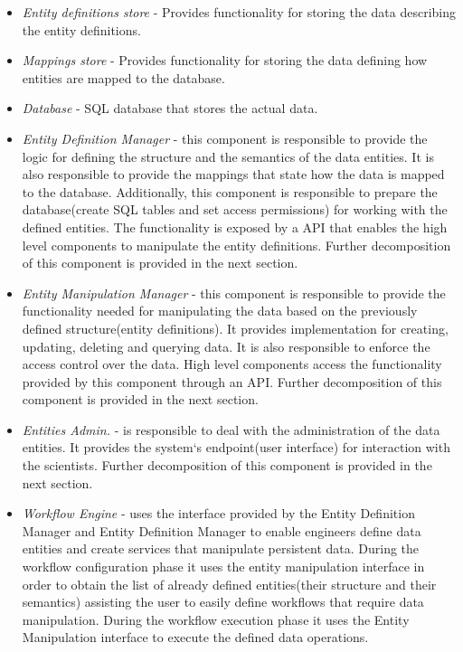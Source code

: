 \documentclass[a4paper, notitlepage]{article}
\begin{document}
\begin{itemize}
	
		\item \textit{Entity definitions store} - Provides functionality for storing the data describing the entity definitions. 
		
	\item \textit{Mappings store} - Provides functionality for storing the data defining how entities are mapped to the database.  
	
	\item \textit{Database} - SQL database that stores the actual data.
	
	\item \textit{Entity Definition Manager} - this component is responsible to provide the logic for defining the structure and the semantics of the data entities. It is also responsible to provide the mappings that state how the data is mapped to the database. Additionally, this component is responsible to prepare the database(create SQL tables and set access permissions) for working with the defined entities. The functionality is exposed by a API that enables the high level components to manipulate the entity definitions. Further decomposition of this component is provided in the next section.
		
	\item \textit{Entity Manipulation Manager} - this component is responsible to provide the functionality needed for manipulating the data based on the previously defined structure(entity definitions). It provides implementation for creating, updating, deleting and querying data. It is also responsible to enforce the access control over the data. High level components access the functionality provided by this component through an API. Further decomposition of this component is provided in the next section.
	
	\item \textit{Entities Admin.} - is responsible to deal with the administration of the data entities. It provides the system`s endpoint(user interface) for interaction with the scientists. Further decomposition of this component is provided in the next section.

	\item \textit{Workflow Engine} - uses the interface provided by the Entity Definition Manager and Entity Definition Manager to enable engineers define data entities and create services that manipulate persistent data. During the workflow configuration phase it uses the entity manipulation interface in order to obtain the list of already defined entities(their structure and their semantics) assisting the user to easily define workflows that require data manipulation. During the workflow execution phase it uses the Entity Manipulation interface to execute the defined data operations.
\end{itemize}
\end{document}
